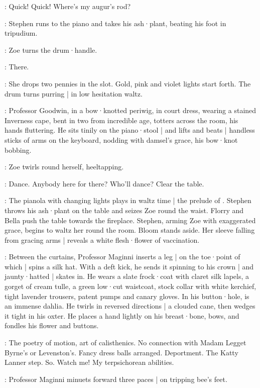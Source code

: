 \Stephen:
Quick!
Quick!
Where's my augur's rod?

:
Stephen runs to the piano and takes his ash·plant,
beating his foot in tripudium.

:
Zoe turns the drum·handle.

\Zoe:
There.

:
She drops two pennies in the slot.
Gold,
pink and violet lights start forth.
The drum turns purring |
in low hesitation waltz.

:
Professor Goodwin,
in a bow·knotted periwig,
in court dress,
wearing a stained Inverness cape,
bent in two from incredible age,
totters across the room,
his hands fluttering.
%
He sits tinily on the piano·stool |
and lifts and beats |
handless sticks of arms on the keyboard,
nodding with damsel's grace,
his bow·knot bobbing.

:
Zoe twirls round herself,
heeltapping.

\Zoe:
Dance.
Anybody here for there?
Who'll dance?
Clear the table.

:
The pianola with changing lights plays in waltz time |
the prelude of .
Stephen throws his ash·plant on the table and seizes Zoe round the waist.
Florry and Bella push the table towards the fireplace.
Stephen,
arming Zoe with exaggerated grace,
begins to waltz her round the room.
Bloom stands aside.
%
Her sleeve falling from gracing arms |
reveals a white flesh·flower of vaccination.

:
Between the curtains,
Professor Maginni inserts a leg |
on the toe·point of which |
spins a silk hat.
With a deft kick,
he sends it spinning to his crown |
and jaunty·hatted |
skates in.
He wears a slate frock·coat with claret silk lapels,
a gorget of cream tulle,
a green low·cut waistcoat,
stock collar with white kerchief,
tight lavender trousers,
patent pumps
and canary gloves.
In his button·hole,
is an immense dahlia.
He twirls in reversed directions |
a clouded cane,
then wedges it tight in his oxter.
He places a hand lightly on his breast·bone,
%
bows,
and fondles his flower and buttons.

\Maginni[2]:
The poetry of motion,
art of calisthenics.
No connection with Madam Legget Byrne's or Levenston's.
Fancy dress balls arranged.
Deportment.
The Katty Lanner step.
So.
Watch me!
My terpsichorean abilities.

:
Professor Maginni minuets forward three paces |
on tripping bee's feet.

